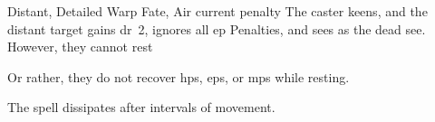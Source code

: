   {Distant, Detailed}%
  {Warp}%
  {Fate, Air}%
  {current  penalty}%
  {The caster keens, and the distant target gains \gls{dr}~2, ignores all \gls{ep} Penalties, and sees as the dead see.
  However, they cannot rest}%
  {Or rather, they do not recover \glspl{hp}, \glspl{ep}, or \glspl{mp} while resting.

  The spell dissipates after  \glspl{interval} of movement.}

